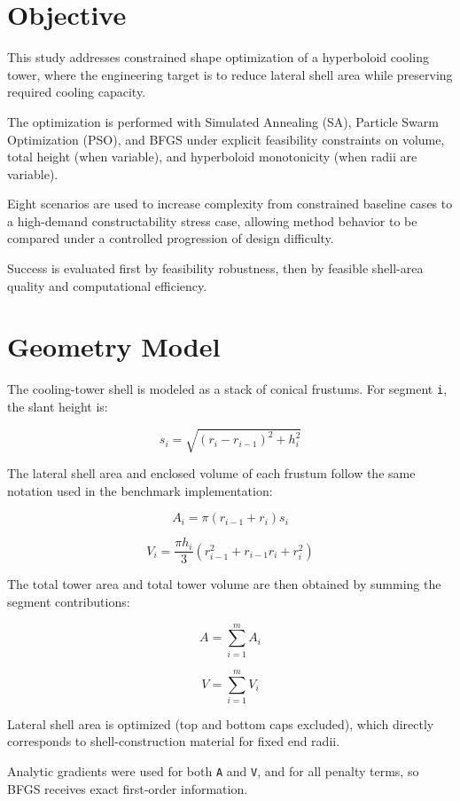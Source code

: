 
\chapter{Objective}

This study addresses constrained shape optimization of a hyperboloid cooling tower, where the engineering target is to reduce lateral shell area while preserving required cooling capacity.

The optimization is performed with Simulated Annealing (SA), Particle Swarm Optimization (PSO), and BFGS under explicit feasibility constraints on volume, total height (when variable), and hyperboloid monotonicity (when radii are variable).

Eight scenarios are used to increase complexity from constrained baseline cases to a high-demand constructability stress case, allowing method behavior to be compared under a controlled progression of design difficulty.

Success is evaluated first by feasibility robustness, then by feasible shell-area quality and computational efficiency.


\chapter{Geometry Model}

The cooling-tower shell is modeled as a stack of conical frustums. For segment \texttt{i}, the slant height is:


\[
s_i = \sqrt{(r_i - r_{i-1})^2 + h_i^2}
\]


The lateral shell area and enclosed volume of each frustum follow the same notation used in the benchmark implementation:


\[
A_i = \pi (r_{i-1} + r_i) s_i
\]


\[
V_i = \frac{\pi h_i}{3} \left(r_{i-1}^2 + r_{i-1} r_i + r_i^2\right)
\]


The total tower area and total tower volume are then obtained by summing the segment contributions:


\[
A = \sum_{i=1}^{m} A_i
\]


\[
V = \sum_{i=1}^{m} V_i
\]


Lateral shell area is optimized (top and bottom caps excluded), which directly corresponds to shell-construction material for fixed end radii.

Analytic gradients were used for both \texttt{A} and \texttt{V}, and for all penalty terms, so BFGS receives exact first-order information.


